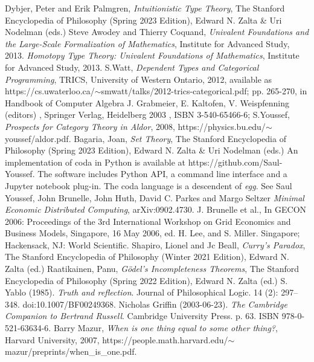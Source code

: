 \documentclass[11pt]{article}
\begin{document}
\begin{thebibliography}{10}
 Dybjer, Peter and Erik Palmgren, {\it Intuitionistic Type Theory}, The Stanford Encyclopedia of Philosophy (Spring 2023 Edition), Edward N. Zalta \& Uri Nodelman (eds.)
 Steve Awodey and Thierry Coquand, {\it Univalent Foundations and the Large-Scale Formalization of Mathematics}, Institute for Advanced Study, 2013.
 {\it Homotopy Type Theory: Univalent Foundations of Mathematics}, Institute for Advanced Study, 2013.
 S.Watt, {\it Dependent Types and Categorical Programming}, TRICS, University of Western Ontario, 2012, available as {\rm https://cs.uwaterloo.ca/}$\sim${\rm smwatt/talks/2012-trics-categorical.pdf}; pp. 265-270, in Handbook of Computer Algebra J. Grabmeier, E. Kaltofen, V. Weispfenning (editors) , Springer Verlag, Heidelberg 2003 , ISBN 3-540-65466-6; S.Youssef, {\it Prospects for Category Theory in Aldor}, 2008, {\rm https://physics.bu.edu/}$\sim${\rm youssef/aldor.pdf}.
 Bagaria, Joan, {\it Set Theory}, The Stanford Encyclopedia of Philosophy (Spring 2023 Edition), Edward N. Zalta \& Uri Nodelman (eds.)
 An implementation of coda in Python is available at {\rm https://github.com/Saul-Youssef}.  The software includes Python API, a command line 
interface and a Jupyter notebook plug-in.  
 The coda language is a descendent of {\it egg}.  See Saul Youssef, John Brunelle, John Huth, David C. Parkes and Margo Seltzer {\it Minimal Economic Distributed Computing}, arXiv:0902.4730.  J. Brunelle et al., In GECON 2006: Proceedings of the 3rd International Workshop on Grid Economics and Business Models, Singapore, 16 May 2006, ed. H. Lee, and S. Miller. Singapore; Hackensack, NJ: World Scientific.
 Shapiro, Lionel and Jc Beall, {\it Curry’s Paradox}, The Stanford Encyclopedia of Philosophy (Winter 2021 Edition), Edward N. Zalta (ed.)
 Raatikainen, Panu, {\it Gödel’s Incompleteness Theorems}, The Stanford Encyclopedia of Philosophy (Spring 2022 Edition), Edward N. Zalta (ed.)
 S. Yablo (1985). {\it Truth and reflection}. Journal of Philosophical Logic. 14 (2): 297–348. doi:10.1007/BF00249368.
 Nicholas Griffin (2003-06-23). {\it The Cambridge Companion to Bertrand Russell}. Cambridge University Press. p. 63. ISBN 978-0-521-63634-6.
 Barry Mazur, {\it When is one thing equal to some other thing?}, Harvard University, 2007,  {\rm https://people.math.harvard.edu/}$\sim${\rm mazur/preprints/when\_is\_one.pdf}. 
\end{thebibliography}
\end{document}
